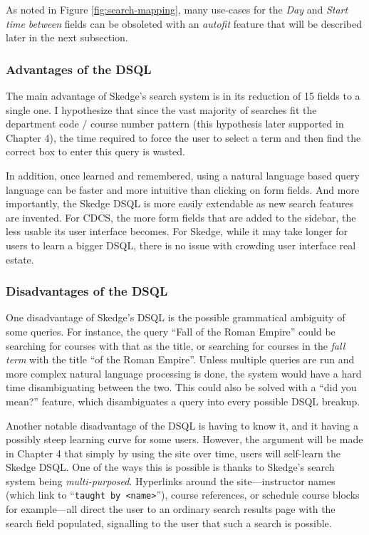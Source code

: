 \doublespacing

As noted in Figure \ref{fig:search-mapping}, many use-cases for the \emph{Day} and \emph{Start time between} fields can be obsoleted with an \emph{autofit} feature that will be described later in the next subsection.

  \subsubsection{Advantages of the DSQL}

    The main advantage of Skedge's search system is in its reduction of 15 fields to a single one. I hypothesize that since the vast majority of searches fit the department code / course number pattern (this hypothesis later supported in Chapter 4), the time required to force the user to select a term and then find the correct box to enter this query is wasted.

    In addition, once learned and remembered, using a natural language based query language can be faster and more intuitive than clicking on form fields. And more importantly, the Skedge DSQL is more easily extendable as new search features are invented. For CDCS, the more form fields that are added to the sidebar, the less usable its user interface becomes. For Skedge, while it may take longer for users to learn a bigger DSQL, there is no issue with crowding user interface real estate.
  
  \subsubsection{Disadvantages of the DSQL}

    One disadvantage of Skedge's DSQL is the possible grammatical ambiguity of some queries. For instance, the query ``Fall of the Roman Empire'' could be searching for courses with that as the title, or searching for courses in the \emph{fall term} with the title ``of the Roman Empire''. Unless multiple queries are run and more complex natural language processing is done, the system would have a hard time disambiguating between the two. This could also be solved with a ``did you mean?'' feature, which disambiguates a query into every possible DSQL breakup.
    
    Another notable disadvantage of the DSQL is having to know it, and it having a possibly steep learning curve for some users. However, the argument will be made in Chapter 4 that simply by using the site over time, users will self-learn the Skedge DSQL. One of the ways this is possible is thanks to Skedge's search system being \emph{multi-purposed}. Hyperlinks around the site---instructor names (which link to ``{\tt taught by <name>}''), course references, or schedule course blocks for example---all direct the user to an ordinary search results page with the search field populated, signalling to the user that such a search is possible.


